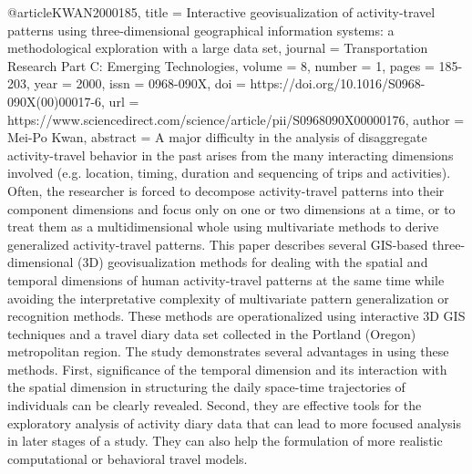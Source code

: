 @article{KWAN2000185,
title = {Interactive geovisualization of activity-travel patterns using three-dimensional geographical information systems: a methodological exploration with a large data set},
journal = {Transportation Research Part C: Emerging Technologies},
volume = {8},
number = {1},
pages = {185-203},
year = {2000},
issn = {0968-090X},
doi = {https://doi.org/10.1016/S0968-090X(00)00017-6},
url = {https://www.sciencedirect.com/science/article/pii/S0968090X00000176},
author = {Mei-Po Kwan},
abstract = {A major difficulty in the analysis of disaggregate activity-travel behavior in the past arises from the many interacting dimensions involved (e.g. location, timing, duration and sequencing of trips and activities). Often, the researcher is forced to decompose activity-travel patterns into their component dimensions and focus only on one or two dimensions at a time, or to treat them as a multidimensional whole using multivariate methods to derive generalized activity-travel patterns. This paper describes several GIS-based three-dimensional (3D) geovisualization methods for dealing with the spatial and temporal dimensions of human activity-travel patterns at the same time while avoiding the interpretative complexity of multivariate pattern generalization or recognition methods. These methods are operationalized using interactive 3D GIS techniques and a travel diary data set collected in the Portland (Oregon) metropolitan region. The study demonstrates several advantages in using these methods. First, significance of the temporal dimension and its interaction with the spatial dimension in structuring the daily space-time trajectories of individuals can be clearly revealed. Second, they are effective tools for the exploratory analysis of activity diary data that can lead to more focused analysis in later stages of a study. They can also help the formulation of more realistic computational or behavioral travel models.}
}